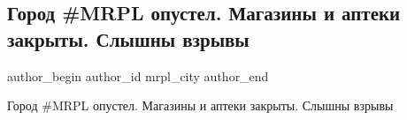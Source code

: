  
 
 
 
 

\subsection{Город \#MRPL опустел. Магазины и аптеки закрыты. Слышны взрывы}
\label{sec:01_03_2022.fb.mrpl_city.1.gorod_mrpl_opustel_slyshny_vzryvy}

\ifcmt
 author_begin
   author_id mrpl_city
 author_end
\fi

Город \#MRPL опустел. Магазины и аптеки закрыты. Слышны взрывы

